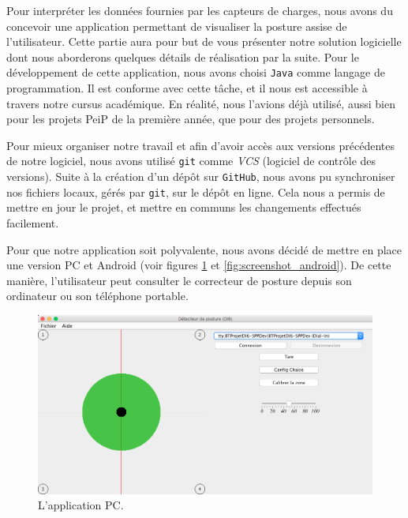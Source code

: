 \documentclass{polytech/polytech}
\begin{document}
Pour interpréter les données fournies par les capteurs de charges, nous avons du concevoir une application permettant de visualiser la posture assise de l'utilisateur.
 Cette partie aura pour but de vous présenter notre solution logicielle dont nous aborderons quelques détails de réalisation par la suite.
Pour le développement de cette application, nous avons choisi \texttt{Java} comme langage de programmation. Il est conforme avec cette tâche, et il nous est accessible à travers notre cursus académique. En réalité, nous l'avions déjà utilisé, aussi bien pour les projets PeiP de la première année, que pour des projets personnels.

Pour mieux organiser notre travail et afin d'avoir accès aux versions précédentes de notre logiciel, nous avons utilisé \texttt{git} comme \textit{VCS} (logiciel de contrôle des versions). Suite à la création d'un dépôt sur \texttt{GitHub}, nous avons pu synchroniser nos fichiers locaux, gérés par \texttt{git}, sur le dépôt en ligne. Cela nous a permis de mettre en jour le projet, et mettre en communs les changements effectués facilement.

Pour que notre application soit polyvalente, nous avons décidé de mettre en place une version PC et Android (voir figures \ref{fig:screenshot_pc} et \ref{fig:screenshot_android}). De cette manière, l'utilisateur peut consulter le correcteur de posture depuis son ordinateur ou son téléphone portable.

\begin{figure}[htbp]
\begin{center}
\includegraphics[width=12cm]{image/screenshot_pc1}
\end{center}
\caption{L'application PC.}
\label{fig:screenshot_pc}
\end{figure}
\end{document}
